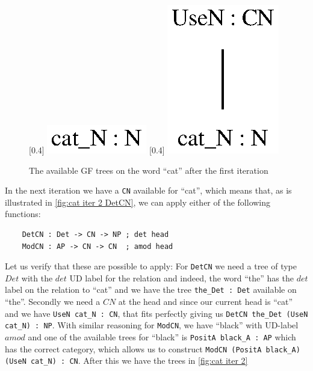 \begin{figure}[H]
    \centering
    [0.4\textwidth]
        {\includegraphics[scale=0.75]{figure/black_cats/cat_N_gf.eps}}
    [0.4\textwidth]
        {\includegraphics[scale=0.75]{figure/black_cats/cat_CN_gf.eps}}
    \caption{The available GF trees on the word ``cat'' after the first iteration}\label{fig:cat iter 1}
\end{figure}

In the next iteration we have a \lstinline|CN| available for ``cat'', which means that, as is illustrated in \autoref{fig:cat iter 2 DetCN}, we can apply either of the following functions:
\begin{lstlisting}
    DetCN : Det -> CN -> NP ; det head
    ModCN : AP -> CN -> CN  ; amod head
\end{lstlisting}
Let us verify that these are possible to apply: For \lstinline|DetCN| we need a tree of type $Det$ with the $det$ \ac{UD} label for the relation and indeed, the word ``the'' has the $det$ label on the relation to ``cat'' and we have the tree \lstinline|the_Det : Det| available on ``the''. Secondly we need a $CN$ at the head and since our current head is ``cat'' and we have \lstinline|UseN cat_N : CN|, that fits perfectly giving us \lstinline|DetCN the_Det (UseN cat_N) : NP|. With similar reasoning for \lstinline{ModCN}, we have ``black'' with \ac{UD}-label $amod$ and one of the available trees for ``black'' is \lstinline|PositA black_A : AP| which has the correct category, which allows us to construct \lstinline|ModCN (PositA black_A) (UseN cat_N) : CN|. After this we have the trees in \autoref{fig:cat iter 2}

